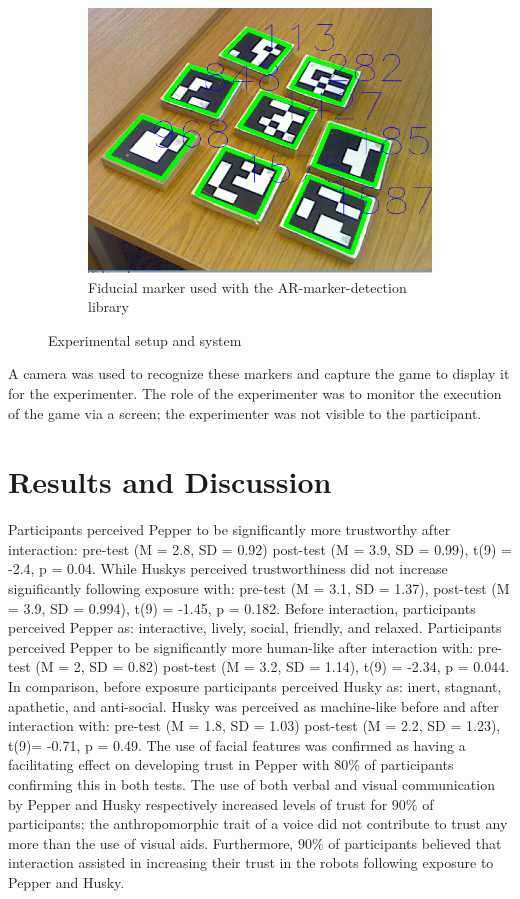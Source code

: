 \documentclass[letterpaper]{article} %
\begin{document}
\begin{figure}
\begin{subfigure}[b]{0.12\textwidth}
        \includegraphics[width=\textwidth]{Picture3.png}
        \caption{Fiducial marker used with the AR-marker-detection library}
        \label{pic3}
    \end{subfigure}
    \caption{Experimental setup and system}\label{fig:animals}
\end{figure}
A camera was used to recognize these markers and capture the game to display it for the experimenter. The role of the experimenter was to monitor the execution of the game via a screen; the experimenter was not visible to the participant.
\section{Results and Discussion  }
Participants perceived Pepper to be significantly more trustworthy after interaction: pre-test (M = 2.8, SD = 0.92) post-test (M = 3.9, SD = 0.99), t(9) = -2.4, p = 0.04. While Huskys perceived trustworthiness did not increase significantly following exposure with: pre-test (M = 3.1, SD = 1.37), post-test (M = 3.9, SD = 0.994), t(9) = -1.45, p = 0.182. Before interaction, participants perceived Pepper as: interactive, lively, social, friendly, and relaxed. Participants perceived Pepper to be significantly more human-like after interaction with: pre-test (M = 2, SD = 0.82) post-test (M = 3.2, SD = 1.14), t(9) = -2.34, p = 0.044. In comparison, before exposure participants perceived Husky as: inert, stagnant, apathetic, and anti-social. Husky was perceived as machine-like before and after interaction with: pre-test (M = 1.8, SD = 1.03) post-test (M = 2.2, SD = 1.23), t(9)= -0.71, p = 0.49. The use of facial features was confirmed as having a facilitating effect on developing trust in Pepper with $80\%$ of participants confirming this in both tests. The use of both verbal and visual communication by Pepper and Husky respectively increased levels of trust for $90\%$ of participants; the anthropomorphic trait of a voice did not contribute to trust any more than the use of visual aids. Furthermore, $90\%$ of participants believed that interaction assisted in increasing their trust in the robots following exposure to Pepper and Husky.
\end{document}
